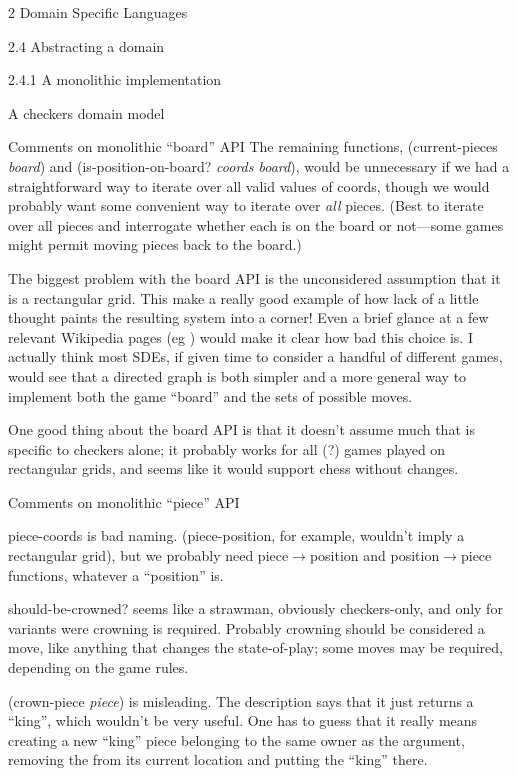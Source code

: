 \documentclass[12pt]{PalisadesLakesBook}
\begin{document}
\begin{plSection}{2 Domain Specific Languages}
\begin{plSection}{2.4 Abstracting a domain}
\begin{plSection}{2.4.1 A monolithic implementation}
\begin{plSection}{A checkers domain model}
\begin{plSection}{Comments on monolithic ``board'' API}
The remaining functions, 
{\schemeFont (current-pieces {\itshape board})} and 
{\schemeFont (is-position-on-board? {\itshape coords board})},
would be unnecessary if we had a straightforward way to iterate
over all valid values of {\schemeFont coords},
though we would probably want some convenient way to iterate
over \emph{all} {\schemeFont pieces}.
(Best to iterate over all pieces and interrogate whether each is 
on the board or not---some games might permit moving pieces
back to the board.)

The biggest problem with the {\schemeFont board} API is 
the unconsidered assumption that it is a rectangular grid.
This make a really good example of how lack of a little thought
paints the resulting system into a corner!
Even a brief glance at a few relevant Wikipedia pages
(eg )
would make it clear how bad this choice is.
I actually think most SDEs, if given time to consider
a handful of different games, would see that a directed graph
is both simpler and a more general way to implement both the game  
``board'' and the sets of possible moves.

One good thing about the {\schemeFont board} API is that
it doesn't assume much that is specific to checkers alone;
it probably works for all (?) games played on rectangular grids,
and seems like it would support chess without changes.

\end{plSection}%
\begin{plSection}{Comments on monolithic ``piece'' API}
\label{sec:monolithic:piece}

{\schemeFont piece-coords} is bad naming.
({\schemeFont piece-position}, for example,
wouldn't imply a rectangular grid),
but we probably need piece$\rightarrow$position
and position$\rightarrow$piece functions, whatever a ``position''
is.

{\schemeFont should-be-crowned?} seems like a strawman,
obviously checkers-only, and only for variants were crowning is
required. 
Probably crowning should be considered a move,
like anything that changes the state-of-play;
some moves may be required, depending on the game rules.

{\schemeFont (crown-piece {\itshape piece})} is misleading.
The description says that it just returns a ``king'',
which wouldn't be very useful.
One has to guess that it really means creating a new ``king''
piece belonging to the same owner as the
{} argument,
removing the {} from its current
location and putting the ``king'' there.


\end{plSection}
\end{plSection}
\end{plSection}
\end{plSection}
\end{plSection}
\end{document}

